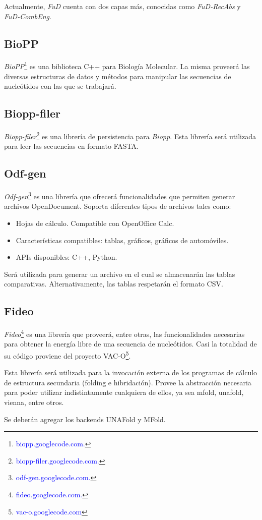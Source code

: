 \documentclass[12pt,a4paper,spanish]{article}
\begin{document}
		\par Actualmente, \emph{FuD} cuenta con dos capas más, conocidas como 
		\emph{FuD-RecAbs} y \emph{FuD-CombEng}.

	\subsection{BioPP}
		\par \textit{BioPP}\footnote{\textcolor{blue}{biopp.googlecode.com.}} es una biblioteca C++ para Biología 			Molecular. La misma proveerá las diversas estructuras de datos y métodos para manipular las secuencias de 			nucleótidos con las que se trabajará. 

	\subsection{Biopp-filer}
		 \par \textit{Biopp-filer}\footnote{\textcolor{blue}{biopp-filer.googlecode.com.}} es una librería de persistencia 			 para \emph{Biopp}. Esta librería será utilizada para leer las secuencias en formato FASTA.  

	\subsection{Odf-gen}
		\textit{Odf-gen}\footnote{\textcolor{blue}{odf-gen.googlecode.com.}} es una librería que ofrecerá funcionalidades 			que permiten generar archivos OpenDocument. Soporta diferentes tipos de archivos tales como:
		\begin{itemize}
			\item Hojas de cálculo. Compatible con OpenOffice Calc.
			\item Características compatibles: tablas, gráficos, gráficos de automóviles.
			\item APIs disponibles: C++, Python.
		\end{itemize}
		 \par Será utilizada para generar un archivo en el cual se almacenarán las tablas comparativas.	Alternativamente, 			las tablas respetarán el formato \textsf{CSV}.
		 
	\subsection{Fideo}
			\textit{Fideo}\footnote{\textcolor{blue}{fideo.googlecode.com.}} es una librería que proveerá, entre otras, 			las funcionalidades necesarias para obtener la energía libre de una secuencia de nucleótidos. Casi la 				totalidad de su código proviene del proyecto VAC-O\footnote{\textcolor{blue}{vac-o.googlecode.com}}.
			\par Esta librería será utilizada para la invocación externa de los programas de cálculo de estructura 				secundaria (folding e hibridación). Provee la abstracción necesaria para poder utilizar indistintamente 			cualquiera de ellos, ya sea mfold, unafold, vienna, entre otros.	 
\par Se deberán agregar los backends \textsf{UNAFold} y \textsf{MFold}. 
\end{document}
